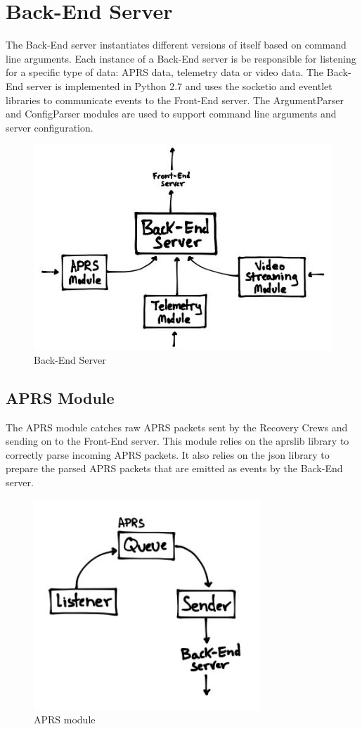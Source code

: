 \section{Back-End Server}
The Back-End server instantiates different versions of itself based on command line arguments.
Each instance of a Back-End server is be responsible for listening for a specific type of data:
APRS data, telemetry data or video data. The Back-End server is implemented in Python 2.7 and
uses the socketio and eventlet libraries to communicate events to the Front-End server.
The ArgumentParser and ConfigParser modules are used to support command line arguments and server
configuration.

\begin{figure}[!ht]
  \centering
  \includegraphics[scale=.8]{imgs/back-end-server.jpg}
  \caption{Back-End Server}
\end{figure}

\subsection{APRS Module}
The APRS module catches raw APRS packets sent by the Recovery Crews and sending on to the Front-End server.
This module relies on the aprslib library to correctly parse incoming APRS packets. It also relies on the 
json library to prepare the parsed APRS packets that are emitted as events by the Back-End server.


\begin{figure}[!ht]
  \centering
  \includegraphics[scale=.8]{imgs/aprs-detailed.jpg}
  \caption{APRS module}
\end{figure}

